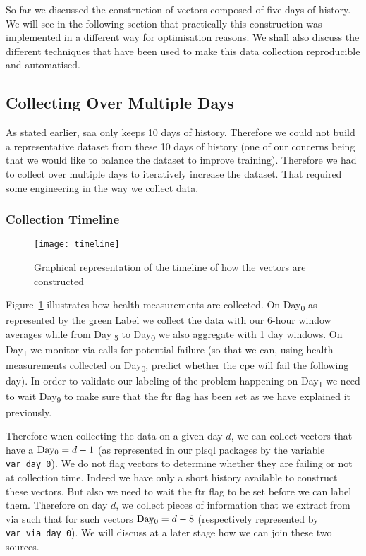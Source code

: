 So far we discussed the construction of vectors composed of five days of history. We will see in the following section that practically this construction was implemented in a different way for optimisation reasons. We shall also discuss the different techniques that have been used to make this data collection reproducible and automatised. 

\subsection{Collecting Over Multiple Days}
\label{subsec:collecting}
As stated earlier, \acrshort{saa} only keeps 10 days of history. Therefore we could not build a representative dataset from these 10 days of history (one of our concerns being that we would like to balance the dataset to improve training). Therefore we had to collect over multiple days to iteratively increase the dataset. That required some engineering in the way we collect data.

\subsubsection{Collection Timeline}

\begin{figure}[ht]
    \begin{center}
    \texttt{[image: timeline]}
    \end{center}
    \caption{Graphical representation of the timeline of how the vectors are constructed}
    \label{timeline}
\end{figure}

Figure~\ref{timeline} illustrates how health measurements are collected. On Day\textsubscript{0} as represented by the green Label we collect the data with our 6-hour window averages while from Day\textsubscript{-5} to Day\textsubscript{0} we also aggregate with 1 day windows. On Day\textsubscript{1} we monitor \acrshort{via} calls for potential failure (so that we can, using health measurements collected on Day\textsubscript{0}, predict whether the \acrshort{cpe} will fail the following day). In order to validate our labeling of the problem happening on Day\textsubscript{1} we need to wait Day\textsubscript{9} to make sure that the \acrshort{ftr} flag has been set as we have explained it previously. 

Therefore when collecting the data on a given day $d$, we can collect vectors that have a $\text{Day\textsubscript{0}} = d-1$ (as represented in our \acrfull{plsql} packages by the variable \texttt{var\_day\_0}). We do not flag vectors to determine whether they are failing or not at collection time. Indeed we have only a short history available to construct these vectors. But also we need to wait the \acrshort{ftr} flag to be set before we can label them. Therefore on day $d$, we collect pieces of information that we extract from \acrshort{via} such that for such vectors $\text{Day\textsubscript{0}} = d-8$ (respectively represented by \texttt{var\_via\_day\_0}). We will discuss at a later stage how we can join these two sources.



